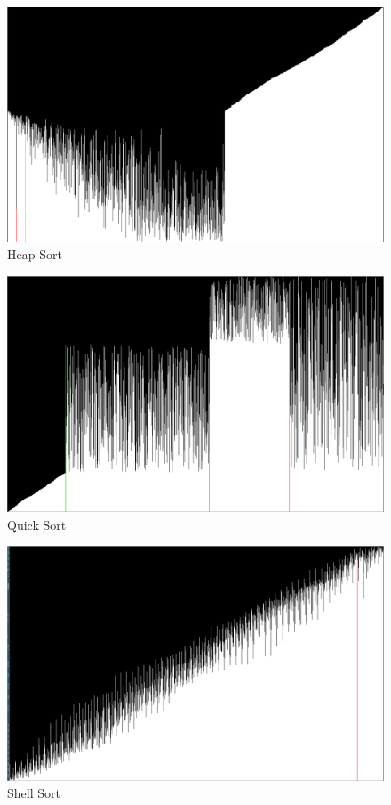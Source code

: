 \documentclass{article}
\begin{document}
\begin{figure}[H]
  \centering
  \includegraphics[width=\linewidth,scale=0.4]{./screenshot2.png}
  \caption{Heap Sort}
  \label{fig:Heap Sort}
\end{figure}

\begin{figure}[H]
  \centering
  \includegraphics[width=\linewidth,scale=0.4]{./screenshot3.png}
  \caption{Quick Sort}
  \label{fig:Quick Sort}
\end{figure}

\begin{figure}[H]
  \centering
  \includegraphics[width=\linewidth,scale=0.4]{./screenshot4.png}
  \caption{Shell Sort}
  \label{fig:Shell Sort}
\end{figure}
\end{document}
